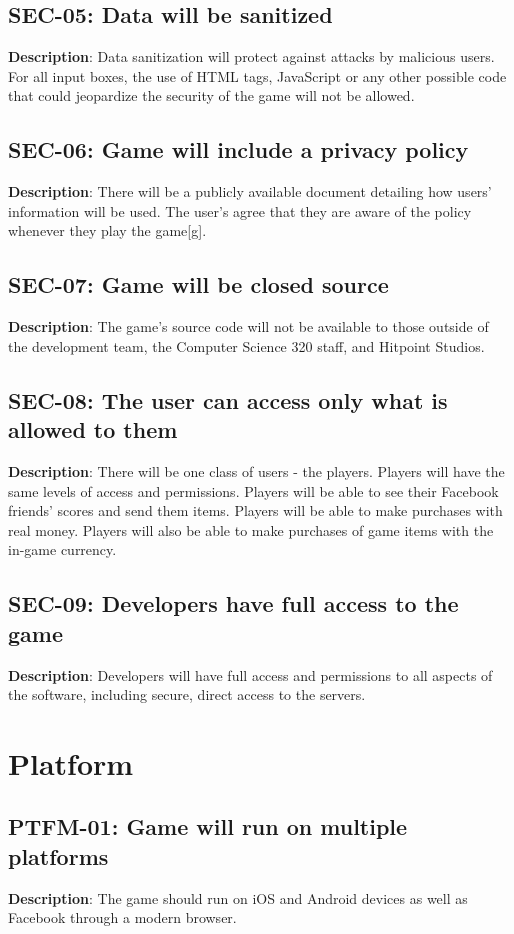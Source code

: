 \subsection{SEC-05: Data will be sanitized}
\textbf{Description}: Data sanitization will protect against attacks by malicious
users. For all input boxes, the use of HTML tags, JavaScript or any
other possible code that could jeopardize the security of the game
will not be allowed.
\subsection{SEC-06: Game will include a privacy policy}
\textbf{Description}: There will be a publicly available document detailing
how users\textquoteright{} information will be used. The user\textquoteright{}s
agree that they are aware of the policy whenever they play the game{[}g{]}.
\subsection{SEC-07: Game will be closed source}
\textbf{Description}: The game\textquoteright{}s source code will not be available
to those outside of the development team, the Computer Science 320
staff, and Hitpoint Studios.
\subsection{SEC-08: The user can access only what is allowed to them}
\textbf{Description}: There will be one class of users - the players. Players
will have the same levels of access and permissions. Players will
be able to see their Facebook friends\textquoteright{} scores and
send them items. Players will be able to make purchases with real
money. Players will also be able to make purchases of game items with
the in-game currency.
\subsection{SEC-09: Developers have full access to the game}
\textbf{Description}: Developers will have full access and permissions to all
aspects of the software, including secure, direct access to the servers.
\section{Platform}
\subsection{PTFM-01: Game will run on multiple platforms}
\textbf{Description}: The game should run on iOS and Android devices as well
as Facebook through a modern browser.
